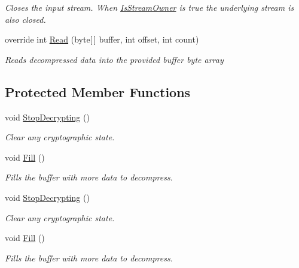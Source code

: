 \begin{DoxyCompactItemize}
\begin{DoxyCompactList}\small\item\em Closes the input stream. When \hyperlink{class_i_c_sharp_code_1_1_sharp_zip_lib_1_1_zip_1_1_compression_1_1_streams_1_1_inflater_input_stream_ab9b5354e07738945e2f1ff664441088e}{Is\+Stream\+Owner} is true the underlying stream is also closed. \end{DoxyCompactList}\item 
override int \hyperlink{class_i_c_sharp_code_1_1_sharp_zip_lib_1_1_zip_1_1_compression_1_1_streams_1_1_inflater_input_stream_a0ac9269f0c6b75c099605e3363eec65d}{Read} (byte\mbox{[}$\,$\mbox{]} buffer, int offset, int count)
\begin{DoxyCompactList}\small\item\em Reads decompressed data into the provided buffer byte array \end{DoxyCompactList}\end{DoxyCompactItemize}
\subsection*{Protected Member Functions}
\begin{DoxyCompactItemize}
\item 
void \hyperlink{class_i_c_sharp_code_1_1_sharp_zip_lib_1_1_zip_1_1_compression_1_1_streams_1_1_inflater_input_stream_a6d506363680e0526607c965f3367c1c7}{Stop\+Decrypting} ()
\begin{DoxyCompactList}\small\item\em Clear any cryptographic state. \end{DoxyCompactList}\item 
void \hyperlink{class_i_c_sharp_code_1_1_sharp_zip_lib_1_1_zip_1_1_compression_1_1_streams_1_1_inflater_input_stream_a8436322c4ee3aa34638219b0f39b4ab5}{Fill} ()
\begin{DoxyCompactList}\small\item\em Fills the buffer with more data to decompress. \end{DoxyCompactList}\item 
void \hyperlink{class_i_c_sharp_code_1_1_sharp_zip_lib_1_1_zip_1_1_compression_1_1_streams_1_1_inflater_input_stream_a6d506363680e0526607c965f3367c1c7}{Stop\+Decrypting} ()
\begin{DoxyCompactList}\small\item\em Clear any cryptographic state. \end{DoxyCompactList}\item 
void \hyperlink{class_i_c_sharp_code_1_1_sharp_zip_lib_1_1_zip_1_1_compression_1_1_streams_1_1_inflater_input_stream_a8436322c4ee3aa34638219b0f39b4ab5}{Fill} ()
\begin{DoxyCompactList}\small\item\em Fills the buffer with more data to decompress. \end{DoxyCompactList}\end{DoxyCompactItemize}
